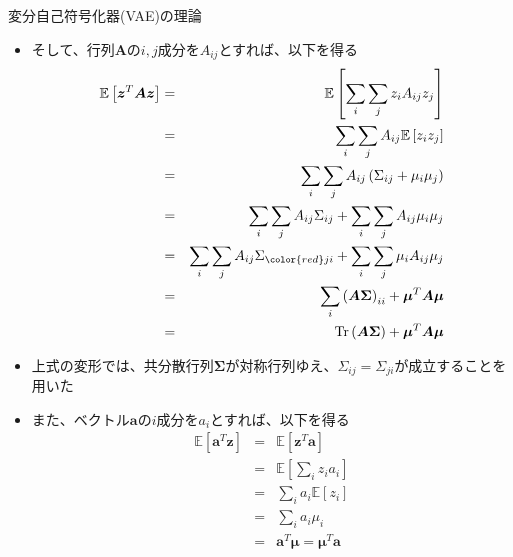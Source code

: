\documentclass[dvipdfmx,notheorems,t]{beamer}
\begin{document}
\begin{frame}{変分自己符号化器(VAE)の理論}
\begin{itemize}
\begin{itemize}
		\item そして、行列$\bm{A}$の$i, j$成分を$A_{ij}$とすれば、以下を得る
		\begin{eqnarray}
			\mathbb{E} \left[ \bm{z}^T \bm{A} \bm{z} \right]
			&=& \mathbb{E} \left[ \sum_i \sum_j z_i A_{ij} z_j \right] \nonumber \\
			&=& \sum_i \sum_j A_{ij} \mathbb{E} \left[ z_i z_j \right] \nonumber \\
			&=& \sum_i \sum_j A_{ij} \left( \Sigma_{ij} + \mu_i \mu_j \right) \nonumber \\
			&=& \sum_i \sum_j A_{ij} \Sigma_{ij} + \sum_i \sum_j A_{ij} \mu_i \mu_j \nonumber \\
			&=& \sum_i \sum_j A_{ij} \Sigma_{\color{red}ji\normalcolor} + \sum_i \sum_j \mu_i A_{ij} \mu_j \nonumber \\
			&=& \sum_i \left( \bm{A} \bm{\Sigma} \right)_{ii} + \bm{\mu}^T \bm{A} \bm{\mu} \nonumber \\
			&=& \Tr \left( \bm{A} \bm{\Sigma} \right) + \bm{\mu}^T \bm{A} \bm{\mu}
		\end{eqnarray}
		
		\item 上式の変形では、共分散行列$\bm{\Sigma}$が対称行列ゆえ、$\Sigma_{ij} = \Sigma_{ji}$が成立することを用いた
		
		\item また、ベクトル$\bm{a}$の$i$成分を$a_i$とすれば、以下を得る
		\begin{eqnarray}
			\mathbb{E} \left[ \bm{a}^T \bm{z} \right]
			&=& \mathbb{E} \left[ \bm{z}^T \bm{a} \right] \nonumber \\
			&=& \mathbb{E} \left[ \sum_i z_i a_i \right] \nonumber \\
			&=& \sum_i a_i \mathbb{E} \left[ z_i \right] \nonumber \\
			&=& \sum_i a_i \mu_i \nonumber \\
			&=& \bm{a}^T \bm{\mu} = \bm{\mu}^T \bm{a}
		\end{eqnarray}
		

\end{itemize}
\end{itemize}
\end{frame}
\end{document}
